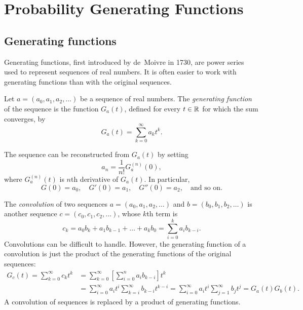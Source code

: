 \chapter{Probability Generating Functions}\label{chap:pgfs}
\section{Generating functions}
Generating functions, first introduced by de~Moivre in 1730, are power series used to represent sequences of real numbers. It is often easier to work with generating functions than with the original sequences.

\begin{definition}
Let $a = (a_0,a_1,a_2,\ldots)$ be a sequence of real numbers. The \emph{generating function} of the sequence is the function $G_a(t)$, defined for every $t\in\mathbb{R}$ for which the sum converges, by
\[
G_a(t) = \sum_{k=0}^{\infty} a_k t^k.
\]
\end{definition}

The sequence can be reconstructed from $G_a(t)$ by setting 
\[
\displaystyle a_n = \frac{1}{n!} G_a^{(n)}(0),
\]
where $G_a^{(n)}(t)$ is $n$th derivative of $G_a(t)$. In particular,
\[
G(0) = a_0,\quad G'(0) = a_1,\quad G''(0) = a_2,\quad \text{and so on.}
\]

\begin{example}
The \emph{convolution} of two sequences $a=(a_0,a_1,a_2,\ldots)$ and $b=(b_0,b_1,b_2,\ldots)$ is another sequence $c=(c_0,c_1,c_2,\ldots)$, whose $k$th term is
\[
c_k = a_0 b_k + a_1 b_{k-1} + \ldots + a_k b_0 = \sum_{i=0}^k a_i b_{k-i}.
\]
Convolutions can be difficult to handle. However, the generating function of a convolution is just the product of the generating functions of the original sequences:
\begin{align*}
G_c(t) = \sum_{k=0}^\infty c_k t^k
	& = \sum_{k=0}^\infty\left[\sum_{i=0}^n a_i b_{k-i}\right] t^k \\
	& = \sum_{i=0}^\infty a_i t^i \sum_{k=i}^\infty b_{k-i} t^{k-i} 
	= \sum_{i=0}^\infty a_i t^i \sum_{j=1}^\infty b_j t^j 
	 = G_a(t)G_b(t).
\end{align*}
A convolution of sequences is replaced by a product of generating functions.
\end{example}

